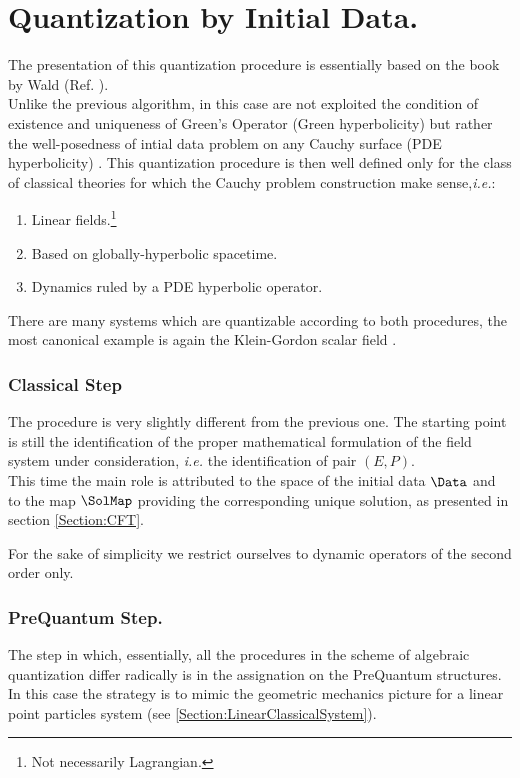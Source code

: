 \documentclass[Main]{subfiles}
\begin{document}
\section{Quantization by Initial Data.}
	The presentation of this quantization procedure is essentially based on the book by Wald  (Ref. \cite{Wald1994}).\\
	Unlike the previous algorithm, in this case are not exploited the condition of existence and uniqueness of Green's Operator (Green hyperbolicity) but rather the well-posedness of intial data problem on any Cauchy surface (PDE hyperbolicity) .
	This quantization procedure is then well defined  only for the class of classical theories for which the Cauchy problem construction make sense,\textit{i.e.}:
	\begin{enumerate}
		\item Linear fields.\footnote{Not necessarily Lagrangian.}
		\item Based on globally-hyperbolic spacetime.
		\item Dynamics ruled by a PDE hyperbolic operator.	
	\end{enumerate}
	There are many systems  which are quantizable according to both procedures, the most canonical example is again the Klein-Gordon scalar field \cite{Wald1994}.

	\subsubsection{Classical Step}
		The procedure is very slightly different from the previous one.	
		The starting point is still the identification of the  proper mathematical formulation of  the field system under consideration, \textit{i.e.} the identification of pair $(E,P)$.
		\\
		This time the main role is attributed to the space of the initial data $\Data$ and to the map $\SolMap$ providing the corresponding unique solution, as presented in section \ref{Section:CFT}.

		\begin{NB}
		
				For the sake of simplicity we restrict ourselves to dynamic operators of the second order only.
		\end{NB}

	\subsubsection{PreQuantum Step.}
		The step in which, essentially, all the procedures in the scheme of algebraic quantization differ radically is in the assignation on the PreQuantum structures.
		In this case the strategy is to mimic the geometric mechanics picture for a linear point particles system (see \ref{Section:LinearClassicalSystem}).
				
\end{document}
